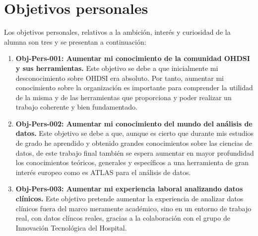 \section{Objetivos personales} \label{sec:02objPersonal}

Los objetivos personales, relativos a la ambición, interés y curiosidad de la alumna son tres y se presentan a continuación:

%

\begin{enumerate}

    \item \textbf{Obj-Pers-001: Aumentar mi conocimiento de la comunidad OHDSI y sus herramientas.} Este objetivo se debe a que inicialmente mi desconocimiento sobre  OHDSI era absoluto. Por tanto, aumentar mi conocimiento sobre la organización es importante para comprender la utilidad de la misma y de las herramientas que proporciona y poder realizar un trabajo coherente y bien fundamentado.

    \item \textbf{Obj-Pers-002: Aumentar mi conocimiento del mundo del análisis de datos.} Este objetivo se debe a que, aunque es cierto que durante mis estudios de grado he aprendido y obtenido grandes conocimientos sobre las ciencias de datos, de este trabajo final también se espera aumentar en mayor profundidad los conocimientos teóricos, generales y específicos a una herramienta de gran interés europeo como es ATLAS para el análisis de datos.

    \item \textbf{Obj-Pers-003: Aumentar mi experiencia laboral analizando datos clínicos.} Este objetivo pretende aumentar la experiencia de analizar datos clínicos fuera del marco meramente académico, sino en un entorno de trabajo real, con datos clíncos reales, gracias a la colaboración con el grupo de Innovación Tecnológica del Hospital.
    
\end{enumerate}



